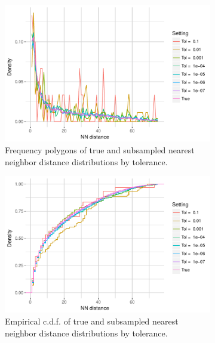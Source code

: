 \documentclass{article}
\begin{document}
\begin{figure}
    \begin{subfigure}{.49\textwidth}
        \includegraphics[width=\linewidth]{Figures/NearestNeighbor/Sequence/freqpoly_by_tol.pdf}
   		\caption{Frequency polygons of true and subsampled nearest neighbor distance distributions by tolerance.}
    	\label{fig:NNFreqPolySequence}
    \end{subfigure}
    \begin{subfigure}{.49\textwidth}
        \includegraphics[width=\linewidth]{Figures/NearestNeighbor/Sequence/ecdf_by_tol.pdf}
    	\caption{Empirical c.d.f. of true and subsampled nearest neighbor distance distributions by tolerance.}
    	\label{fig:NNECDFSequence}
    \end{subfigure}
    \begin{subfigure}{.49\textwidth}

\end{subfigure}
\end{figure}
\end{document}
